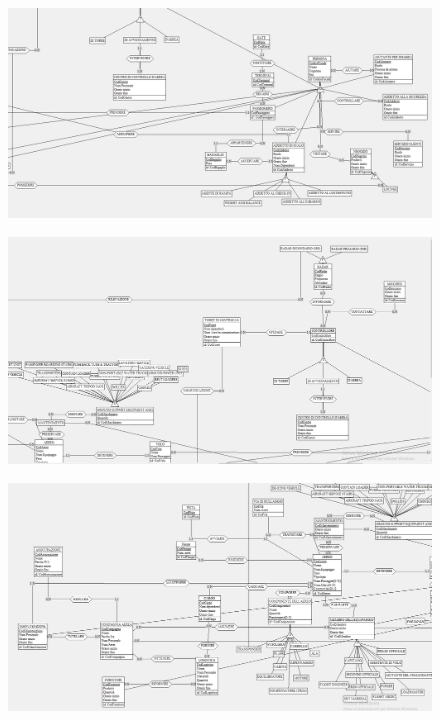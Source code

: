 \begin{figure}
	\includegraphics[width=1.2\textwidth]{./img/Schema_Finale2.png}
	\caption{}
	\label{fig:s2}
\end{figure}

\begin{figure}
	\includegraphics[width=1.2\textwidth]{./img/Schema_Finale3.png}
	\caption{}
	\label{fig:s3}
\end{figure}

\begin{figure}
	\includegraphics[width=1.2\textwidth]{./img/Schema_Finale4.png}
	\caption{}
	\label{fig:s4}
\end{figure}


